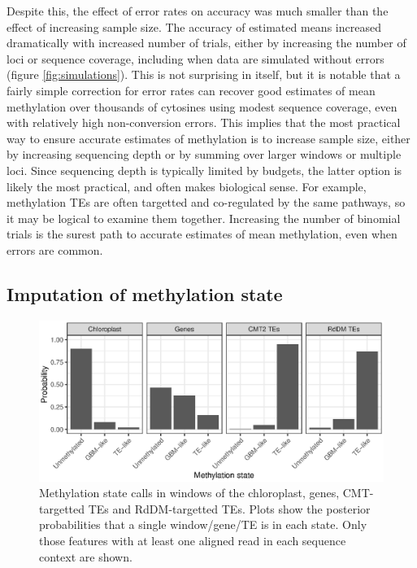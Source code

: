 \documentclass[twocolumn,twoside,lettersize]{article}
\begin{document}
Despite this, the effect of error rates on accuracy was much smaller than the effect of increasing sample size.
The accuracy of estimated means increased dramatically with increased number of trials, either by increasing the number of loci or sequence coverage, including when data are simulated without errors (figure \ref{fig:simulations}).
This is not surprising in itself, but it is notable that a fairly simple correction for error rates can recover good estimates of mean methylation over thousands of cytosines using modest sequence coverage, even with relatively high non-conversion errors.
This implies that the most practical way to ensure accurate estimates of methylation is to increase sample size, either by increasing sequencing depth or by summing over larger windows or multiple loci.
Since sequencing depth is typically limited by budgets, the latter option is likely the most practical, and often makes biological sense.
For example, methylation TEs are often targetted and co-regulated by the same pathways, so it may be logical to examine them together.
Increasing the number of binomial trials is the surest path to accurate estimates of mean methylation, even when errors are common.

\subsection{Imputation of methylation state}

\begin{figure}
    \centering
    \includegraphics{figure4.eps}
    \caption{
        Methylation state calls in windows of the chloroplast, genes, CMT-targetted TEs and RdDM-targetted TEs.
        Plots show the posterior probabilities that a single window/gene/TE is in each state.
        Only those features with at least one aligned read in each sequence context are shown.
    }
    \label{fig:meth-state}
\end{figure}
\end{document}
